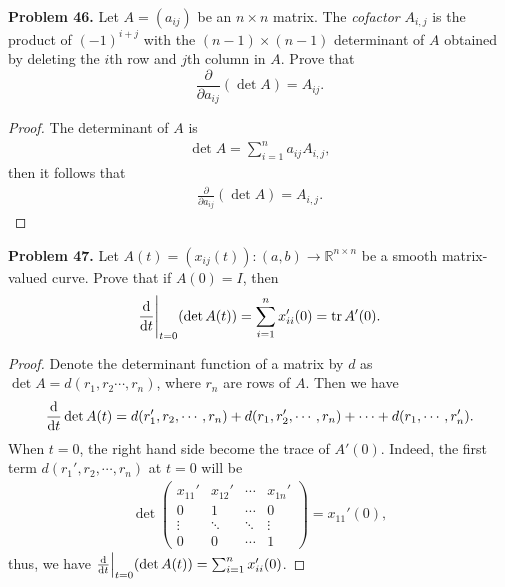 \documentclass[12pt,leqno]{amsart}
\theoremstyle{definition}
\begin{document}
\noindent
{\bf Problem 46.}
Let $A=\left(a_{ij}\right)$ be an $n\times n$ matrix. The {\em cofactor} $A_{i,j}$
is the product of $(-1)^{i+j}$ with the $(n-1)\times(n-1)$ determinant of $A$ obtained by deleting the
$i$th row and $j$th column in $A$.  Prove that
$$
\frac{\partial}{\partial a_{ij}}(\det A)=A_{ij}.
$$
\begin{proof}
The determinant of $A$ is 
\begin{align*}
    \det A = \sum^n_{i=1} a_{ij} A_{i,j},
\end{align*}
then it follows that
\begin{align*}
    \frac{\partial}{\partial a_{ij}}(\det A)=A_{i,j}.
\end{align*}
\end{proof}

\medskip

\noindent
{\bf Problem 47.}
Let $A(t)=\left(x_{ij}(t)\right):(a,b)\to\mathbb{R}^{n\times n}$ be a smooth matrix-valued curve.
Prove that if $A(0)=I$, then
$$
\dv{}{t}\Bigg|_{t=0}(\det A(t))=\sum_{i=1}^n x_{ii}'(0)={\rm tr}\, A'(0).
$$
\begin{proof}
Denote the determinant function of a matrix by $d$ as $\det A = d(r_1, r_2 \cdots, r_n)$, where $r_n$ are rows of $A$. Then we have
\begin{align*}
    \dv{}{t} \det A(t) = d(r_1',r_2,\cdots,r_n) + d(r_1,r_2',\cdots,r_n) + \cdots + d(r_1,\cdots,r_n').
\end{align*}
When $t = 0$, the right hand side become the trace of $A'(0)$. Indeed, the first term $d(r_1',r_2,\cdots,r_n)$ at $t = 0$ will be
\begin{align*}
    \det \begin{pmatrix}
        x_{11}' & x_{12}' & \cdots & x_{1n}' \\
        0       & 1       & \cdots & 0 \\
        \vdots  & \ddots  & \ddots & \vdots \\
        0       & 0       & \cdots & 1
    \end{pmatrix} = x_{11}'(0),
\end{align*}
thus, we have $\dv{}{t}\Big|_{t=0}(\det A(t))=\sum_{i=1}^n x_{ii}'(0)$.
\end{proof}

\medskip
\end{document}

